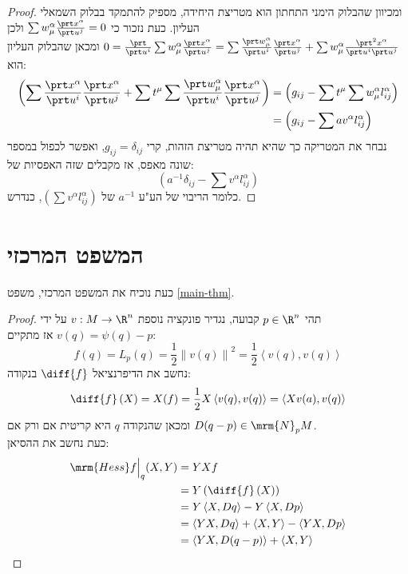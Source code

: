 \documentclass{article}
\theoremstyle{definition}
\newcommand{\norm}[1]{\left\lVert#1\right\rVert}
\begin{document}
\begin{proof}
		ומכיוון שהבלוק הימני התחתון הוא מטריצת היחידה, מספיק להתמקד בבלוק השמאלי העליון.
		כעת נזכור כי
		\(
			\sum w_\mu^\alpha \frac{\prt x^\alpha}{\prt u^j}
			=0
		\)
		ולכן
		\(
			0
			=\frac{\prt}{\prt u^i} \sum w_\mu^\alpha \frac{\prt x^\alpha}{\prt u^j}
			=\sum \frac{\prt w_\mu^\alpha}{\prt u^i} \frac{\prt x^\alpha}{\prt u^j} + \sum w_\mu^\alpha \frac{\prt^2 x^\alpha}{\prt u^i \prt u^j}
		\)
		ומכאן שהבלוק העליון הוא:
		\begin{equation*}\begin{split}
			\left(\sum \frac{\prt x^\alpha}{\prt u^i} \frac{\prt x^\alpha}{\prt u^j} + \sum t^\mu \sum \frac{\prt w_\mu^\alpha}{\prt u^i} \frac{\prt x^\alpha}{\prt u^j}\right)
			&= \left(g_{ij} - \sum t^\mu \sum w_\mu^\alpha l^\alpha_{ij}\right)
			\\&= \left(g_{ij} - \sum a v^\alpha l^\alpha_{ij}\right)
		\end{split}\end{equation*}
		נבחר את המטריקה כך שהיא תהיה מטריצת הזהות, קרי
		\(g_{ij}=\delta_{ij}\),
		ואפשר לכפול במספר שונה מאפס, אז מקבלים שזה האפסיות של:
		\[
			\left(a^{-1} \delta_{ij} - \sum v^\alpha l^\alpha_{ij}\right)
		\]
		כלומר הריבוי של הע"ע
		\(a^{-1}\)
		של
		\(
			\left(\sum v^\alpha l^\alpha_{ij}\right)
		\),
		כנדרש.
	\end{proof}




	\section{המשפט המרכזי}
	
	כעת נוכיח את המשפט המרכזי, משפט \ref{main-thm}.
	\begin{proof}
		תהי
		\(p\in\R^n\)
		קבועה, נגדיר פונקציה נוספת
		\(v: M\to \R^n\)
		על ידי
		\(v(q) = \psi(q)-p\)
		אז מתקיים:
		\[
			f(q)
			=L_p(q)
			=\frac{1}{2}\norm{v(q)}^2
			=\frac{1}{2}\left\langle v(q),v(q) \right\rangle
		\]
		נחשב את הדיפרנציאל
		\(\diff{f}\)
		בנקודה:
		\begin{equation*}
			\diff{f}\left(X\right)
			=X(f)
			=\frac{1}{2}X\left\langle v(q),v(q) \right\rangle
			=\left\langle Xv(a),v(q) \right\rangle
		\end{equation*}
		ומכאן שהנקודה \(q\) היא קריטית אם ורק אם
		\(D(q-p)\in \mrm{N}_p M\).
		\\
		כעת נחשב את ההסיאן:
		\begin{equation*}\begin{split}
			\mrm{Hess} f\Big|_q(X,Y)
			&=YXf
			\\&=Y\left(\diff{f}\left(X\right)\right)
			\\&=Y\left\langle X,Dq \right\rangle
			-Y\left\langle X,Dp \right\rangle
			\\&=\left\langle YX,Dq \right\rangle
			+\left\langle X,Y \right\rangle
			-\left\langle YX,Dp \right\rangle
			\\&=\left\langle YX,D(q-p) \right\rangle
			+\left\langle X,Y \right\rangle
		\end{split}\end{equation*}
	\end{proof}
	
\end{document}
